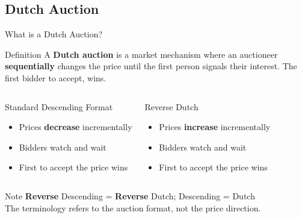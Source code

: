 \documentclass[xcolor={x11names}]{beamer}
\begin{document}
\subsection{Dutch Auction}

\begin{frame}{What is a Dutch Auction?}
\begin{block}{Definition}
A \textbf{Dutch auction} is a market mechanism where an auctioneer \textbf{sequentially} changes the price until the first person signals their interest. The first bidder to accept, wins.
\end{block}
\begin{columns}[T]
\begin{exampleblock}{Standard Descending Format}
\begin{itemize}
\item Prices \textbf{decrease} incrementally
\item Bidders watch and wait
\item First to accept the price wins
\end{itemize}
\end{exampleblock}
\begin{exampleblock}{Reverse Dutch}
\begin{itemize}
\item Prices \textbf{increase} incrementally
\item Bidders watch and wait
\item First to accept the price wins
\end{itemize}
\end{exampleblock}
\end{columns}
\begin{alertblock}{Note}
\textbf{Reverse} Descending = \textbf{Reverse} Dutch; Descending = Dutch \\
The terminology refers to the auction format, not the price direction.
\end{alertblock}
\end{frame}
\end{document}
